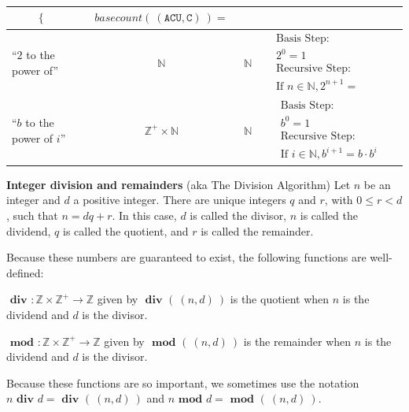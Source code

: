 \documentclass[12pt, oneside]{article}
\newcommand{\A}[0]{\texttt{A}}
\newcommand{\C}[0]{\texttt{C}}
\newcommand{\U}[0]{\texttt{U}}
\begin{document}
\begin{center}
\begin{tabular}{p{0.65in}ccp{2.4in}p{2.4in}}
{\begin{align*}
\begin{cases}
    \end{cases}
    \end{align*}} & 
    {\begin{align*}
        basecount(~(\A\C\U, \C)~) = 
    \end{align*}}\\
\hline
``$2$ to the power of''& $\mathbb{N}$ & $\mathbb{N}$ & 
{\begin{align*}    
&\textrm{Basis Step:} \\
&2^0= 1 \\
&\textrm{Recursive Step:}\\
&\textrm{If } n \in \mathbb{N}, 2^{n+1} = \phantom{2 \cdot 2^n}
\end{align*}}\\
\hline
``$b$ to the power of $i$''& $\mathbb{Z}^+ \times \mathbb{N}$ & $\mathbb{N}$ & 
{\begin{align*}    
&\textrm{Basis Step:} \\
&b^0 = 1 \\
&\textrm{Recursive Step:}\\
&\textrm{If } i \in \mathbb{N}, b^{i+1} = b \cdot b^i
\end{align*}}
\end{tabular}
\end{center}

\newpage \newpage


{\bf Integer division and remainders} (aka The Division Algorithm) Let $n$ be an integer 
and $d$ a positive integer. There are unique integers $q$ and $r$, with $0 \leq r < d$, such that 
$n = dq + r$. In this case, $d$ is called the divisor, $n$ is called the dividend, 
$q$ is called the quotient, 
and $r$ is called the remainder. 

Because these numbers are guaranteed to exist, the following functions are well-defined: 

$\textbf{ div } : \mathbb{Z} \times \mathbb{Z}^+ \to \mathbb{Z}$ given by $\textbf{ div } ( ~(n,d)~)$ 
is the quotient when $n$ is the dividend and $d$ is the divisor.

$\textbf{ mod } : \mathbb{Z} \times \mathbb{Z}^+ \to \mathbb{Z}$ given by $\textbf{ mod } ( ~(n,d)~)$ 
is the remainder when $n$ is the dividend and $d$ is the divisor.

Because these functions are so important, we sometimes use the notation
$n \textbf{ div } d = \textbf{ div } ( ~(n,d)~)$ and $n \textbf{ mod } d = \textbf{ mod } (~(n,d)~)$.
\end{document}
